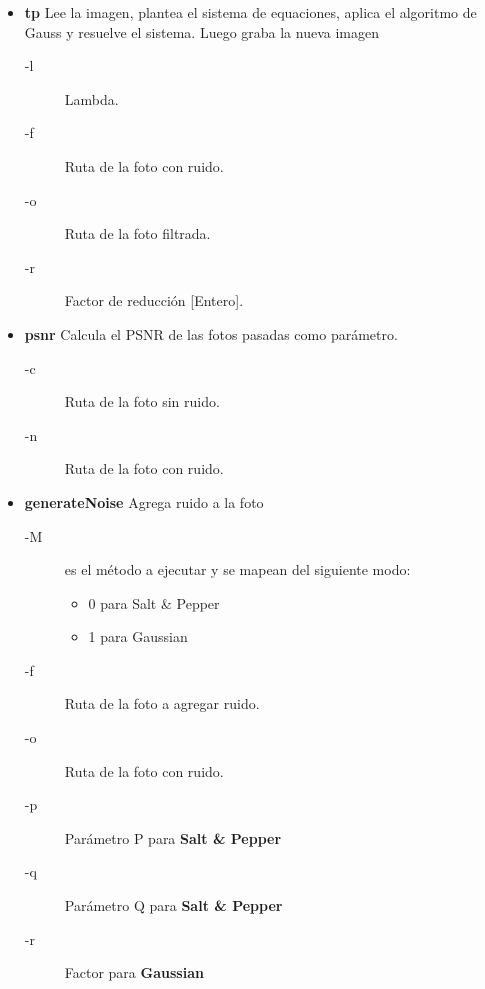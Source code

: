\documentclass[a4paper]{article}
\begin{document}
\begin{itemize}
  \item \textbf{tp} Lee la imagen, plantea el sistema de equaciones, aplica el algoritmo de Gauss y resuelve el sistema. Luego graba la nueva imagen
  \begin{description}
	\item[-l] Lambda.
	\item[-f] Ruta de la foto con ruido.
	\item[-o] Ruta de la foto filtrada.
	\item[-r] Factor de reducción [Entero].
  \end{description}


  \item \textbf{psnr} Calcula el PSNR de las fotos pasadas como parámetro.
  \begin{description}
	\item[-c] Ruta de la foto sin ruido.
	\item[-n] Ruta de la foto con ruido.
  \end{description}

  \item \textbf{generateNoise} Agrega ruido a la foto
  \begin{description}
	\item[-M] es el método a ejecutar y se mapean del siguiente modo:
	\begin{itemize}
	   \item 0 para Salt \& Pepper
	   \item 1 para Gaussian
         \end{itemize}

	\item[-f] Ruta de la foto a agregar ruido.
	\item[-o] Ruta de la foto con ruido.
	\item[-p] Parámetro P para \textbf{Salt \& Pepper}
	\item[-q] Parámetro Q para \textbf{Salt \& Pepper}
	\item[-r] Factor para \textbf{Gaussian}
  \end{description}

\end{itemize}

\newpage

\end{document}
